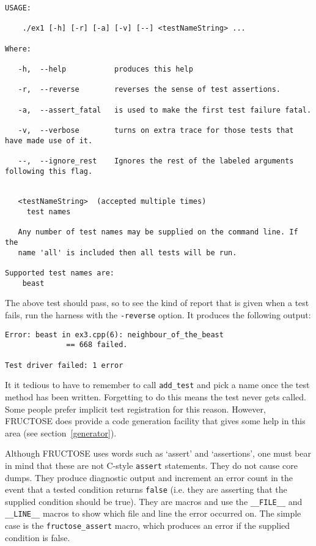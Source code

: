 \documentclass{book}
\begin{document}
\begin{verbatim}
USAGE: 

    ./ex1 [-h] [-r] [-a] [-v] [--] <testNameString> ...

Where: 

   -h,  --help           produces this help

   -r,  --reverse        reverses the sense of test assertions.

   -a,  --assert_fatal   is used to make the first test failure fatal.

   -v,  --verbose        turns on extra trace for those tests that have made use of it.

   --,  --ignore_rest    Ignores the rest of the labeled arguments following this flag.


   <testNameString>  (accepted multiple times)
     test names

   Any number of test names may be supplied on the command line. If the
   name 'all' is included then all tests will be run.

Supported test names are:
    beast
\end{verbatim}

The above test should pass, so to see the kind of report that
is given when a test fails, run the harness with the {\tt -reverse}
option. It produces the following output:

\begin{verbatim}
Error: beast in ex3.cpp(6): neighbour_of_the_beast
              == 668 failed.

Test driver failed: 1 error
\end{verbatim}

It it tedious to have to remember to call {\tt add\_test} and pick a name
once the test method has been written. Forgetting to do this means the
test never gets called. Some people prefer implicit test registration
for this reason. However, FRUCTOSE does provide a code generation facility
that gives some help in this area (see section~\ref{generator}).



Although FRUCTOSE uses words such as `assert' and `assertions',
one must bear in mind that these are not C-style {\tt assert}
statements. They do not cause core dumps. They produce diagnostic
output and increment an error count in the event that a tested
condition returns {\tt false} (i.e. they are asserting
that the supplied condition should be true). 
They are macros and use the
{\tt \_\_FILE\_\_} and {\tt \_\_LINE\_\_}
macros to show which file and line the error occurred on.
The simple case is the {\tt fructose\_assert} macro,
which produces an error if the supplied condition is false.
\end{document}
